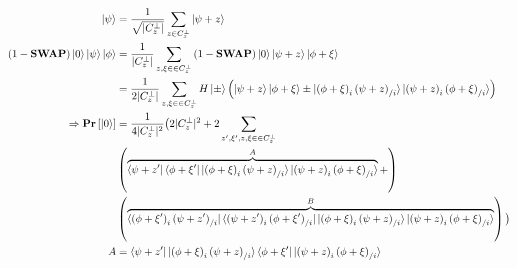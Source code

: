 \documentclass[manuscript,screen,review]{acmart}
\begin{document}
\begin{equation*}
  \begin{split}
    \ket{\psi} & = \frac{1}{\sqrt{|C_{z}^{\perp}|}}\sum_{z \in C_{z}^{\perp}}{ \ket{\psi + z   }} \\ 
    (1-\mathbf{SWAP})\ket{0}\ket{\psi}\ket{\phi} &= \frac{1}{|C_{z}^{\perp}|}\sum_{z,\xi \in  \in C_{z}^{\perp} }{(1-\mathbf{SWAP})\ket{0} \ket{\psi + z   }\ket{\phi + \xi   }}\\
    & = \frac{1}{2|C_{z}^{\perp}|}\sum_{z,\xi \in  \in C_{z}^{\perp} }{  H\ket{\pm} \left( \ket{\psi + z   }\ket{\phi + \xi   }  \pm  \ket{  \left( \phi + \xi \right)_{ i }\left( \psi + z \right)_{ / i }   }\ket{\left( \psi + z \right)_{ i }\left( \phi + \xi \right)_{ / i }  }  \right) }\\
    \Rightarrow \mathbf{Pr} \left[ { \ket{0} } \right] &=  \frac{1}{4|C_{z}^{\perp}|^{2}} \big(  2 |C_{z}^{\perp}|^{2} + 2 \sum_{z^{\prime},\xi^{\prime},  z,\xi \in  \in C_{z}^{\perp} }   \\
    & \left( \overbrace{    \bra{\psi + z^{\prime}   }\bra{\phi + \xi^{\prime}   } \ket{  \left( \phi + \xi \right)_{ i }\left( \psi + z \right)_{ / i }   }\ket{\left( \psi + z \right)_{ i }\left( \phi + \xi \right)_{ / i }  }}^{A}+  \right) \\
  &  \left(  \overbrace{ \bra{  \left( \phi + \xi^{\prime} \right)_{ i }\left( \psi + z^{\prime} \right)_{ / i }   }\bra{\left( \psi + z^{\prime} \right)_{ i }\left( \phi + \xi^{\prime} \right)_{ / i }  }  \ket{  \left( \phi + \xi \right)_{ i }\left( \psi + z \right)_{ / i }   }\ket{\left( \psi + z \right)_{ i }\left( \phi + \xi \right)_{ / i }  } }^{B} \right) \big) \\ 
    A &=     \bra{\psi + z^{\prime}   }\ket{  \left( \phi + \xi \right)_{ i }\left( \psi + z \right)_{ / i }   } \bra{\phi + \xi^{\prime}   } \ket{\left( \psi + z \right)_{ i }\left( \phi + \xi \right)_{ / i }  }  
  \end{split}
\end{equation*}


\printbibliography
\end{document}

